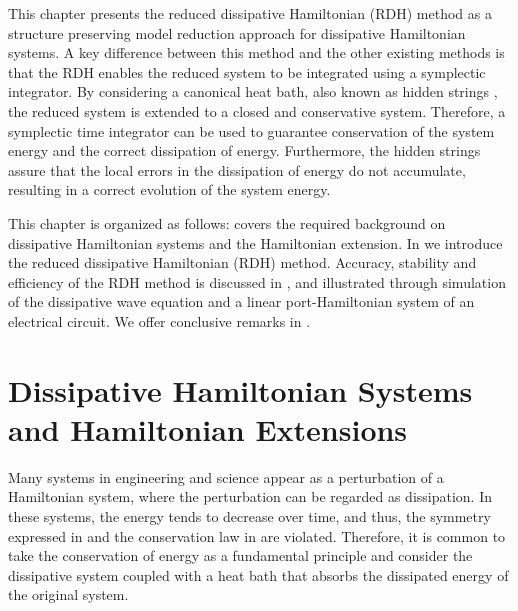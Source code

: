 This chapter presents the reduced dissipative Hamiltonian (RDH) method as a structure preserving model reduction approach for dissipative Hamiltonian systems. A key difference between this method and the other existing methods is that the RDH enables the reduced system to be integrated using a symplectic integrator. By considering a canonical heat bath, also known as hidden strings \cite{figotin2007hamiltonian,figotin2005spectral}, the reduced system is extended to a closed and conservative system. Therefore, a symplectic time integrator can be used to guarantee conservation of the system energy and the correct dissipation of energy. Furthermore, the hidden strings assure that the local errors in the dissipation of energy do not accumulate, resulting in a correct evolution of the system energy.  

This chapter is organized as follows:  covers the required background on dissipative Hamiltonian systems and the Hamiltonian extension. In  we introduce the reduced dissipative Hamiltonian (RDH) method. Accuracy, stability and efficiency of the RDH method is discussed in , and illustrated through simulation of the dissipative wave equation and a linear port-Hamiltonian system of an electrical circuit. We offer conclusive remarks in .



\section{Dissipative Hamiltonian Systems and Hamiltonian Extensions} \label{p3.sec:2}

Many systems in engineering and science appear as a perturbation of a Hamiltonian system, where the perturbation can be regarded as dissipation. In these systems, the energy tends to decrease over time, and thus, the symmetry expressed in  and the conservation law in  are violated. Therefore, it is common to take the conservation of energy as a fundamental principle and consider the dissipative system coupled with a heat bath that absorbs the dissipated energy of the original system. 

